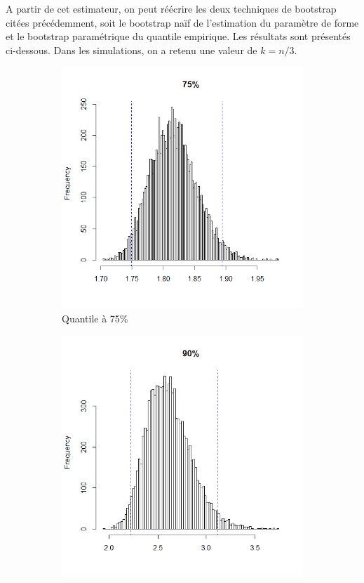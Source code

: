 \documentclass{article}
\renewcommand*{\(}{ \left( }
\renewcommand*{\)}{ \right) }
\begin{document}
A partir de cet estimateur, on peut réécrire les deux techniques de bootstrap citées précédemment, soit le bootstrap naïf de l'estimation du paramètre de forme et le bootstrap paramétrique du quantile empirique. Les résultats sont présentés ci-dessous. Dans les simulations, on a retenu une valeur de $k=n/3$. 

\begin{figure}[H]
    \centering
    \begin{subfigure}[t]{0.3\textwidth}
        \includegraphics[width = \linewidth]{img/BootstrapAHill-75-100-V2.png}
        \caption{Quantile à 75\%}
        \label{fig:BAH75} %
    \end{subfigure}%
    \begin{subfigure}[t]{0.3\textwidth}
        \includegraphics[width = \linewidth]{img/BootstrapAHill-90-100-V2.png}

\end{subfigure}
\end{figure}
\end{document}
